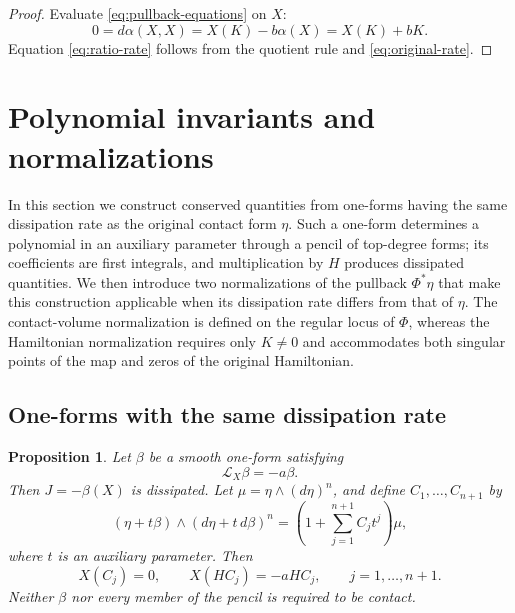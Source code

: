 \documentclass[11pt,a4paper]{article}
\numberwithin{equation}{section}
\newtheorem{proposition}{Proposition}
\theoremstyle{definition}
\theoremstyle{remark}
\begin{document}
\begin{proof}
Evaluate \eqref{eq:pullback-equations} on $X$:
\[
0=d\alpha(X,X)=X(K)-b\alpha(X)=X(K)+bK.
\]
Equation \eqref{eq:ratio-rate} follows from the quotient rule
and \eqref{eq:original-rate}.
\end{proof}





\section{Polynomial invariants and normalizations}
\label{sec:polynomial}

In this section we construct conserved quantities from one-forms having
the same dissipation rate as the original contact form
$\eta$. Such a one-form determines a polynomial in an
auxiliary parameter through a pencil of top-degree forms;
its coefficients are first integrals, and multiplication
by $H$ produces dissipated quantities. We then introduce
two normalizations of the pullback $\Phi^*\eta$ that make
this construction applicable when its dissipation rate
differs from that of $\eta$. The contact-volume
normalization is defined on the regular locus of $\Phi$,
whereas the Hamiltonian normalization requires only
$K\neq0$ and accommodates both singular points of the map
and zeros of the original Hamiltonian.




\subsection{One-forms with the same dissipation rate}

\begin{proposition}
\label{prop:pencil}
Let $\beta$ be a smooth one-form satisfying
\begin{equation}
\mathcal L_X\beta=-a\beta.
\label{eq:beta-rate}
\end{equation}
Then $J=-\beta(X)$ is dissipated. Let
$\mu=\eta\wedge(d\eta)^n$, and define $C_1,\ldots,C_{n+1}$
by
\begin{equation}
(\eta+t\beta)\wedge(d\eta+t\,d\beta)^n
=\left(1+\sum_{j=1}^{n+1}C_jt^j\right)\mu,
\label{eq:pencil}
\end{equation}
where $t$ is an auxiliary parameter. Then
\begin{equation}
X(C_j)=0,\qquad
X(HC_j)=-aHC_j,\qquad j=1,\ldots,n+1.
\label{eq:pencil-invariants}
\end{equation}
Neither $\beta$ nor every member of the pencil is required
to be contact.
\end{proposition}
\end{document}
